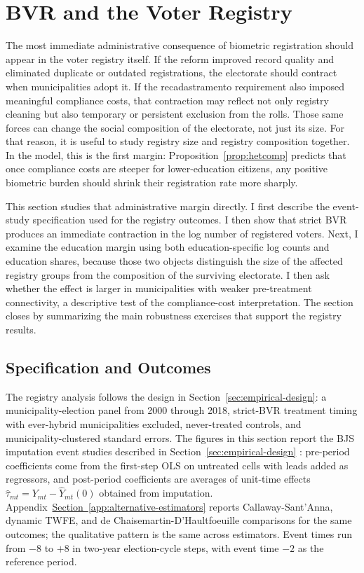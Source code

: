 \section{BVR and the Voter Registry}
\label{sec:electorate-size}

The most immediate administrative consequence of biometric registration should appear in the voter registry itself. If the reform improved record quality and eliminated duplicate or outdated registrations, the electorate should contract when municipalities adopt it. If the recadastramento requirement also imposed meaningful compliance costs, that contraction may reflect not only registry cleaning but also temporary or persistent exclusion from the rolls. Those same forces can change the social composition of the electorate, not just its size. For that reason, it is useful to study registry size and registry composition together. In the model, this is the first margin: Proposition~\ref{prop:hetcomp} predicts that once compliance costs are steeper for lower-education citizens, any positive biometric burden should shrink their registration rate more sharply.

This section studies that administrative margin directly. I first describe the event-study specification used for the registry outcomes. I then show that strict BVR produces an immediate contraction in the log number of registered voters. Next, I examine the education margin using both education-specific log counts and education shares, because those two objects distinguish the size of the affected registry groups from the composition of the surviving electorate. I then ask whether the effect is larger in municipalities with weaker pre-treatment connectivity, a descriptive test of the compliance-cost interpretation. The section closes by summarizing the main robustness exercises that support the registry results.

\subsection{Specification and Outcomes}
\label{ssec:bvr-registry-specification}

The registry analysis follows the design in Section~\ref{sec:empirical-design}: a municipality-election panel from 2000 through 2018, strict-BVR treatment timing with ever-hybrid municipalities excluded, never-treated controls, and municipality-clustered standard errors. The figures in this section report the BJS imputation event studies described in Section~\ref{sec:empirical-design} \citep{Borusyak2024RevisitiEventStudy}: pre-period coefficients come from the first-step OLS on untreated cells with leads added as regressors, and post-period coefficients are averages of unit-time effects $\hat{\tau}_{mt} = Y_{mt} - \widehat{Y}_{mt}(0)$ obtained from imputation. Appendix~\hyperref[app:alternative-estimators]{Section~\ref*{app:alternative-estimators}} reports Callaway-Sant'Anna, dynamic TWFE, and de Chaisemartin-D'Haultfoeuille comparisons for the same outcomes; the qualitative pattern is the same across estimators. Event times run from $-8$ to $+8$ in two-year election-cycle steps, with event time $-2$ as the reference period.

